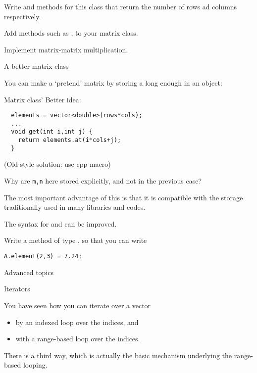 \begin{exercise}
  \label{ex:matrixclass-rowcol1}
  Write  and  methods for this class that return
  the number of rows ad columns respectively.
\end{exercise}

\begin{exercise}
  \label{ex:matrix-methods}
  Add methods such as ,  to your matrix class.

  Implement matrix-matrix multiplication.
\end{exercise}

 {A better matrix class}

You can make a `pretend' matrix by storing a long enough  in
an object:
%

\begin{slide}{Matrix class'}
  \label{sl:matrix-class-cont}
  Better idea:
\begin{lstlisting}
  elements = vector<double>(rows*cols);
  ...
  void get(int i,int j) {
    return elements.at(i*cols+j);
  }
\end{lstlisting}
(Old-style solution: use cpp macro)
\end{slide}

\begin{exercise}
  \label{ex:matrixclass-rowcol2}
  Why are \lstinline{m,n} here stored explicitly, and not in the
  previous case?
\end{exercise}

The most important advantage of this is that it is compatible with
the storage traditionally used in 
many libraries and codes.

The syntax for  and  can be improved.
\begin{exercise}
  Write a method  of type , so that you can write
\begin{lstlisting}
A.element(2,3) = 7.24;
\end{lstlisting}
\end{exercise}

 {Advanced topics}

 {Iterators}
\label{sec:iterator}

You have seen how you can iterate over a vector
\begin{itemize}
\item by an indexed loop over the indices, and
\item with a range-based loop over the indices.
\end{itemize}
There is a third way, which is actually the basic mechanism underlying
the range-based looping.

